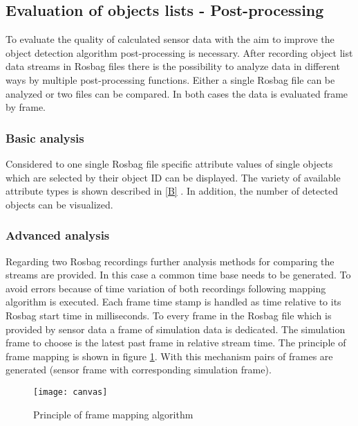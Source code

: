 \subsection{Evaluation of objects lists - Post-processing}
To evaluate the quality of calculated sensor data with the aim to improve the object detection algorithm post-processing is necessary.
After recording object list data streams in Rosbag files there is the possibility to analyze data in different ways by multiple post-processing functions. 
Either a single Rosbag file can be analyzed or two files can be compared. In both cases the data is evaluated frame by frame. 

\subsubsection{Basic analysis}

Considered to one single Rosbag file specific attribute values of single objects which are selected by their object \ac{ID} can be displayed. The variety of available attribute types is shown described in \cref{B} 
. In addition, the number of detected objects can be visualized. \\

\subsubsection{Advanced analysis}
\label{sssec:eval}

Regarding two Rosbag recordings further analysis methods for comparing the streams are provided. In this case a common time base needs to be generated. To avoid errors because of time variation of both recordings following mapping algorithm is executed. Each frame time stamp is handled as time relative to its Rosbag start time in milliseconds. To every frame in the Rosbag file which is provided by sensor data a frame of simulation data is dedicated. The simulation frame to choose is the latest past frame in relative stream time. The principle of frame mapping is shown in figure \ref{fig:frame_mapping}. With this mechanism pairs of frames are generated (sensor frame with corresponding simulation frame).

\begin{figure}[t]
	\centering
	\texttt{[image: canvas]}
	\caption{Principle of frame mapping algorithm}
	\label{fig:frame_mapping}
\end{figure}

